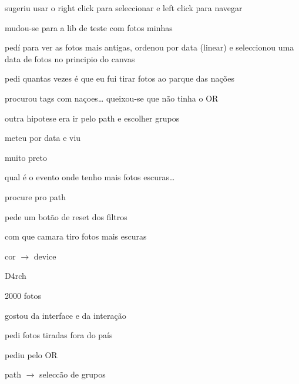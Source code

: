 {\begin{myitemize}
	\item sugeriu usar o right click para seleccionar e left click para navegar


	\item mudou-se para a lib de teste com fotos minhas

	\item pedí para ver as fotos mais antigas, ordenou por data (linear) e seleccionou uma data de fotos no principio do canvas


	\item pedi quantas vezes é que eu fui tirar fotos ao parque das nações

	\item procurou tags com naçoes… queixou-se que não tinha o OR 

	\item outra hipotese era ir pelo path e escolher grupos

	\item meteu por data e viu


	\item muito preto


	\item qual é o evento onde tenho mais fotos escuras…

	\item procure pro path


	\item pede um botão de reset dos filtros


	\item com que camara tiro fotos mais escuras

	\item cor $\rightarrow$ device

\end{myitemize}



D4rch

\begin{myitemize}

	\item 2000 fotos

	\item gostou da interface e da interação


	\item pedi fotos tiradas fora do país

	\item pediu pelo OR

	\item path $\rightarrow$ seleccão de grupos




\end{myitemize}}
